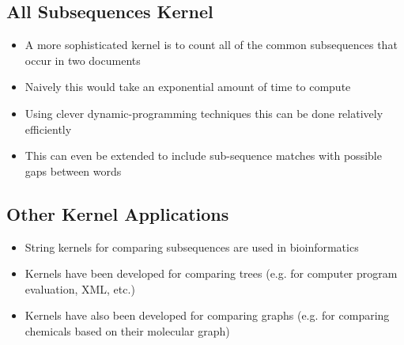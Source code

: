 
\begin{slide}
\section{All Subsequences Kernel}

\begin{PauseHighLight}
  \begin{itemize}
  \item A more sophisticated kernel is to count all of the common
    subsequences that occur in two documents\pause
  \item Naively this would take an exponential amount of time to
    compute\pause
  \item Using clever dynamic-programming techniques this can be done
    relatively efficiently\pause
  \item This can even be extended to include sub-sequence matches with
    possible gaps between words\pause
  \end{itemize}
\end{PauseHighLight}

\end{slide}


\begin{slide}
\section{Other Kernel Applications}

\begin{PauseHighLight}
  \begin{itemize}
  \item String kernels for comparing subsequences are used in
    bioinformatics\pause
  \item Kernels have been developed for comparing trees (e.g. for
    computer program evaluation, XML, etc.)\pause
  \item Kernels have also been developed for comparing graphs (e.g. for
    comparing chemicals based on their molecular graph)\pause
  \end{itemize}
\end{PauseHighLight}

\end{slide}


